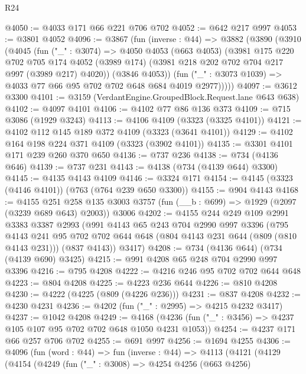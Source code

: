 \begin{lexlean}{R24}
\begin{coremodule}
@4050 := @4033 @171 @66 @221 @706 @702
@4052 := @642 @217 @997
@4053 := @3801 @4052
@4096 := @3867
    (fun (inverse : @44) =>
    @3882
      (@3890
        (@3910
          (@4045
            (fun ("_" : @3074) =>
            @4050
              @4053
              (@663 @4053)
              (@3981
                @175
                @220
                @702
                @705
                @174
                @4052
                (@3989 @174)
                (@3981 @218 @202 @702 @704 @217 @997 (@3989 @217) @4020))
              (@3846 @4053))
            (fun ("_" : @3073 @1039) => @4033 @77 @66 @95 @702 @702 @648 @684 @4019 @2977)))))
@4097 := @3612 @3300
@4101 := @3159 (VerdantEngine.GroupedBlock.Request.lane @643 @638)
@4102 := @4097 @4101
@4106 := @4102 @77 @86 @136 @373
@4109 := @715 @3086 (@1929 @3243)
@4113 := @4106 @4109 (@3323 (@3325 @4101))
@4121 := @4102 @112 @145 @189 @372 @4109 (@3323 (@3641 @4101))
@4129 := @4102 @164 @198 @224 @371 @4109 (@3323 (@3902 @4101))
@4135 := @3301 @4101 @171 @239 @260 @370 @650
@4136 := @737 @236
@4138 := @734 (@4136 @646)
@4139 := @737 @231
@4143 := @4138 (@734 (@4139 @644) @3300)
@4145 := @4135 @4143 @4109
@4146 := @3324 @171
@4154 := @4145 (@3323 (@4146 @4101)) (@763 (@764 @239 @650 @3300))
@4155 := @904 @4143
@4168 := @4155
    @251
    @258
    @135
    @3003
    @3757
    (fun (__b : @699) => @1929 (@2097 (@3239 @689 @643) @2003))
    @3006
@4202 := @4155
    @244
    @249
    @109
    @2991
    @3383
    @3387
    @2993
    (@991
      @4143
      @65
      @243
      @704
      @2990
      @997
      @3396
      (@795
        @4143
        @241
        @95
        @702
        @702
        @644
        @648
        (@804 @4143 @231 @644 (@809 (@810 @4143 @231)))
        (@837 @4143))
      @3417)
@4208 := @734 (@4136 @644) (@734 (@4139 @690) @3425)
@4215 := @991 @4208 @65 @248 @704 @2990 @997 @3396
@4216 := @795 @4208
@4222 := @4216 @246 @95 @702 @702 @644 @648
@4223 := @804 @4208
@4225 := @4223 @236 @644
@4226 := @810 @4208
@4230 := @4222 (@4225 (@809 (@4226 @236)))
@4231 := @837 @4208
@4232 := @4230 @4231
@4236 := @4202 (fun ("_" : @2995) => @4215 @4232 @3417)
@4237 := @1042 @4208
@4249 := @4168 (@4236 (fun ("_" : @3456) => @4237 @105 @107 @95 @702 @702 @648 @1050 @4231 @1053))
@4254 := @4237 @171 @66 @257 @706 @702
@4255 := @691 @997
@4256 := @1694 @4255
@4306 := @4096
    (fun (word : @44) =>
    fun (inverse : @44) =>
    @4113
      (@4121
        (@4129
          (@4154
            (@4249
              (fun ("_" : @3008) =>
              @4254
                @4256
                (@663 @4256)

\end{coremodule}
\end{lexlean}
